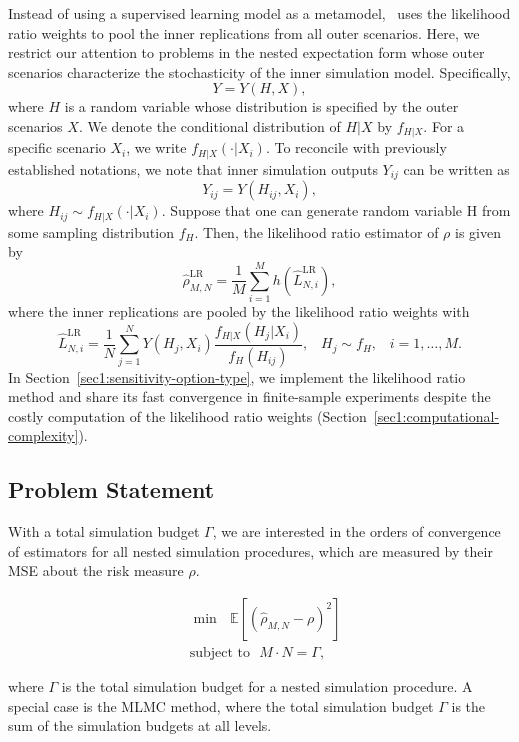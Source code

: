 Instead of using a supervised learning model as a metamodel,~\cite{zhang2022sample} uses the likelihood ratio weights to pool the inner replications from all outer scenarios.
Here, we restrict our attention to problems in the nested expectation form whose outer scenarios characterize the stochasticity of the inner simulation model. 
Specifically,
$$ Y = Y(H, X), $$
where $H$ is a random variable whose distribution is specified by the outer scenarios $X$. 
We denote the conditional distribution of $H|X$ by $f_{H|X}$. 
For a specific scenario $X_i$, we write $f_{H|X}(\cdot |X_i)$. 
To reconcile with previously established notations, we note that inner simulation outputs $Y_{ij}$ can be written as
$$ Y_{ij} = Y(H_{ij}, X_i), $$
where $H_{ij} \sim f_{H|X}(\cdot |X_i)$.
Suppose that one can generate random variable H from some sampling
distribution $f_H$. Then, the likelihood ratio estimator of $\rho$ is given by
$$\hat{\rho}^{\text{LR}}_{M,N} = \frac{1}{M} \sum_{i=1}^M h(\hat{L}^{\text{LR}}_{N, i}), $$ where the inner replications are pooled by the likelihood ratio weights with
$$\hat{L}^{\text{LR}}_{N, i} = \frac{1}{N} \sum_{j=1}^N Y(H_j, X_i) \frac{f_{H|X}(H_{j}|X_i)}{f_H(H_{ij})}, \;\;\; H_j \sim f_H, \;\;\; i=1, \dots, M.$$
In Section~\ref{sec1:sensitivity-option-type}, we implement the likelihood ratio method and share its fast convergence in finite-sample experiments despite the costly computation of the likelihood ratio weights (Section~\ref{sec1:computational-complexity}).

\subsection{Problem Statement}

With a total simulation budget $\Gamma$, we are interested in the orders of convergence of estimators for all nested simulation procedures, which are measured by their MSE about the risk measure $\rho$.

\begin{align}
    & \min ~~~ \mathbb{E} \left[ \left( \hat{\rho}_{M, N} - \rho \right)^2 \right] \nonumber \\
    & \text{subject to} ~~~ M \cdot N = \Gamma, 
\end{align}

where $\Gamma$ is the total simulation budget for a nested simulation procedure.
A special case is the MLMC method, where the total simulation budget $\Gamma$ is the sum of the simulation budgets at all levels.

